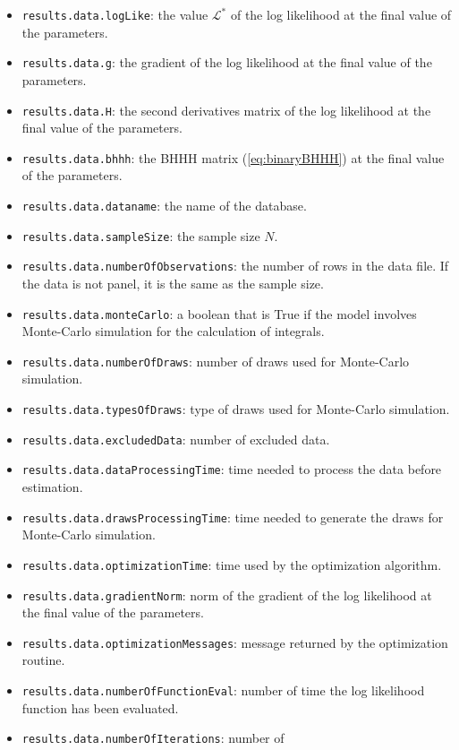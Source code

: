 \documentclass[12pt,a4paper]{article}
\newcommand{\req}[1]{(\ref{#1})}
\begin{document}
\begin{itemize}
\item \lstinline+results.data.logLike+: the value $\mathcal{L}^*$ of
  the log likelihood at the final value of the parameters. 
\item \lstinline+results.data.g+: the gradient of the log likelihood at the final value of the parameters. 
\item \lstinline+results.data.H+: the second derivatives matrix of the log likelihood at the final value of the parameters. 
\item \lstinline+results.data.bhhh+:  the BHHH matrix \req{eq:binaryBHHH}  at the final value of the parameters. 
\item \lstinline+results.data.dataname+: the name of the database.
\item \lstinline+results.data.sampleSize+: the sample size $N$.
\item \lstinline+results.data.numberOfObservations+: the number of
  rows in the data file. If the data is not panel, it is the same as
  the sample size. 
\item \lstinline+results.data.monteCarlo+: a boolean that is True if
  the model involves Monte-Carlo simulation for the calculation of
  integrals. 
\item \lstinline+results.data.numberOfDraws+: number of draws used for
  Monte-Carlo simulation.
\item \lstinline+results.data.typesOfDraws+: type of draws used for
  Monte-Carlo simulation.
\item \lstinline+results.data.excludedData+: number of excluded data. 
\item \lstinline+results.data.dataProcessingTime+: time needed to
  process the data before estimation. 
\item \lstinline+results.data.drawsProcessingTime+: time needed to
  generate the draws for Monte-Carlo simulation. 
\item \lstinline+results.data.optimizationTime+: time used by the
  optimization algorithm. 
\item \lstinline+results.data.gradientNorm+: norm of the gradient of
  the log likelihood at the final value of the parameters. 
\item \lstinline+results.data.optimizationMessages+: message returned
  by the optimization routine. 
\item \lstinline+results.data.numberOfFunctionEval+: number of time
  the log likelihood function has been evaluated. 
\item \lstinline+results.data.numberOfIterations+: number of

\end{itemize}
\end{document}
